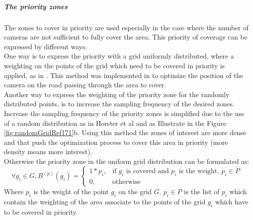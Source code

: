 \subparagraph{The priority zones}
The zones to cover in priority are used especially in the case where the number of cameras are not sufficient to fully cover the area. This priority of coverage can be expressed by different ways. \\
One way is to express  the priority with a grid uniformly distributed, where a  weighting on the points of the grid which need to be covered in priority is applied, as in \cite{141*akbarzadeh2013,84*xu2011}.
 This method was implemented in \citep{141*akbarzadeh2013} to optimize the position of the camera on the road passing through the area to cover. \\
Another way to  express the  weighting of the priority zone  for  the randomly distributed points, is  to increase the sampling frequency of the desired zones. Increase the sampling frequency of the priority zones is simplified due to the use of a random distribution as in Horster et al \citep{171*horster2006} and as Illustrate in the Figure \ref{fig:randomGridRef171}b.
 Using this method the zones of interest are more dense and that push the optimization process to cover this area in priority (more density means more interest).\\
Otherwise the priority zone in the uniform grid distribution can be formulated as: 
  \begin{equation}\label{eq:PciP}
\forall g_i \in G, B^{(p)}(g_i)= \begin{cases} 1*p_i, & \mbox{if } g_i\mbox{ is covered and  $p_i$ is the weight, }p_i \in P  \\ 0, & \mbox{otherwise}  \end{cases}
\end{equation}
Where $p_i$ is the weight of the point $g_i$ on the grid $G$. $p_i \in P $ is the list of $p_i$ which contain the weighting of the area associate to the points of the grid $g_i$ which have to be covered in priority. \\

